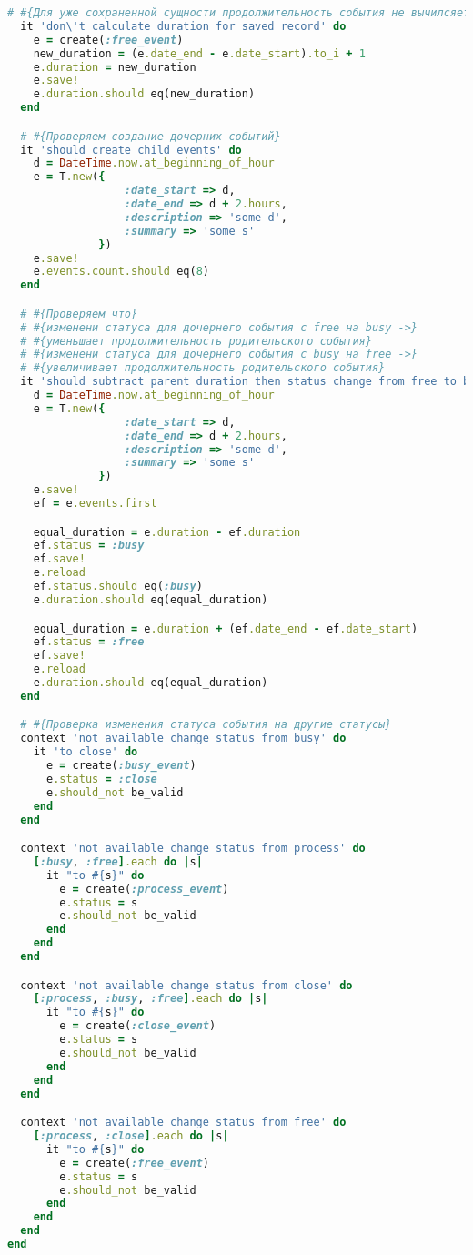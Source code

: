 \begin{lstlisting}[language=Ruby]
  # #{Для уже сохраненной сущности продолжительность события не вычилсяется}
  it 'don\'t calculate duration for saved record' do
    e = create(:free_event)
    new_duration = (e.date_end - e.date_start).to_i + 1
    e.duration = new_duration
    e.save!
    e.duration.should eq(new_duration)
  end

  # #{Проверяем создание дочерних событий}
  it 'should create child events' do
    d = DateTime.now.at_beginning_of_hour
    e = T.new({
                  :date_start => d,
                  :date_end => d + 2.hours,
                  :description => 'some d',
                  :summary => 'some s'
              })
    e.save!
    e.events.count.should eq(8)
  end

  # #{Проверяем что}
  # #{изменени статуса для дочернего события с free на busy ->}
  # #{уменьшает продолжительность родительского события}
  # #{изменени статуса для дочернего события с busy на free ->}
  # #{увеличивает продолжительность родительского события} 
  it 'should subtract parent duration then status change from free to busy' do
    d = DateTime.now.at_beginning_of_hour
    e = T.new({
                  :date_start => d,
                  :date_end => d + 2.hours,
                  :description => 'some d',
                  :summary => 'some s'
              })
    e.save!
    ef = e.events.first

    equal_duration = e.duration - ef.duration
    ef.status = :busy
    ef.save!
    e.reload
    ef.status.should eq(:busy)
    e.duration.should eq(equal_duration)

    equal_duration = e.duration + (ef.date_end - ef.date_start)
    ef.status = :free
    ef.save!
    e.reload
    e.duration.should eq(equal_duration)
  end

  # #{Проверка изменения статуса события на другие статусы}
  context 'not available change status from busy' do
    it 'to close' do
      e = create(:busy_event)
      e.status = :close
      e.should_not be_valid
    end
  end

  context 'not available change status from process' do
    [:busy, :free].each do |s|
      it "to #{s}" do
        e = create(:process_event)
        e.status = s
        e.should_not be_valid
      end
    end
  end

  context 'not available change status from close' do
    [:process, :busy, :free].each do |s|
      it "to #{s}" do
        e = create(:close_event)
        e.status = s
        e.should_not be_valid
      end
    end
  end

  context 'not available change status from free' do
    [:process, :close].each do |s|
      it "to #{s}" do
        e = create(:free_event)
        e.status = s
        e.should_not be_valid
      end
    end
  end
end
\end{lstlisting}